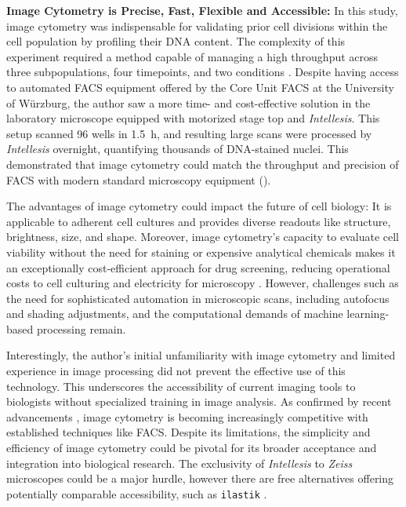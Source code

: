 \textbf{Image Cytometry is Precise, Fast, Flexible and Accessible:}
In this study, image cytometry was indispensable for validating prior cell
divisions within the \nMAina cell population by profiling their DNA content. The
complexity of this experiment required a method capable of managing a high
throughput across three subpopulations, four timepoints, and two conditions
. Despite having access to automated \ac{FACS}
equipment offered by the Core Unit FACS at the University of Würzburg, the
author saw a more time- and cost-effective solution in the laboratory microscope
equipped with motorized stage top and \textit{Intellesis}. This setup scanned 96
wells in \SI{1.5}{\hour}, and resulting large scans were processed
by \textit{Intellesis} overnight, quantifying thousands of DNA-stained nuclei.
This demonstrated that image cytometry could match the throughput and precision
of \ac{FACS} with modern standard microscopy equipment
().

The advantages of image cytometry could impact the future of cell biology: It is
applicable to adherent cell cultures \cite{roukosCellCycleStaging2015} and
provides diverse readouts like structure, brightness, size, and shape. Moreover,
image cytometry's capacity to evaluate cell viability without the need for
staining or expensive analytical chemicals makes it an exceptionally
cost-efficient approach for drug screening, reducing operational costs to cell
culturing and electricity for microscopy
\cite{pattaroneLearningDeepFeatures2021}.  However, challenges such as the need
for sophisticated automation in microscopic scans, including autofocus and
shading adjustments, and the computational demands of machine learning-based
processing remain.


Interestingly, the author's initial unfamiliarity with image cytometry and
limited experience in image processing did not prevent the effective use of this
technology. This underscores the accessibility of current imaging tools to
biologists without specialized training in image analysis. As confirmed by
recent advancements \cite{nittaRapidHighthroughputCell2023}, image cytometry is
becoming increasingly competitive with established techniques like \ac{FACS}.
Despite its limitations, the simplicity and efficiency of image cytometry could
be pivotal for its broader acceptance and integration into biological research.
The exclusivity of \textit{Intellesis} to \textit{Zeiss} microscopes could be a
major hurdle, however there are free alternatives offering potentially comparable
accessibility, such as \texttt{ilastik} \cite{bergIlastikInteractiveMachine2019}.



